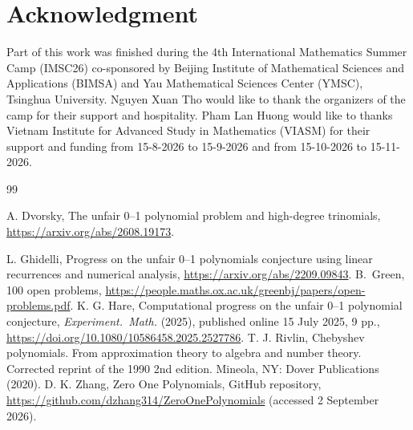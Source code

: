 \documentclass[a4paper,12pt,english,reqno]{amsart}
\theoremstyle{definition}
\theoremstyle{remark}
\begin{document}
\section{Acknowledgment} Part of this work was finished during the 4th International Mathematics Summer Camp (IMSC26) co-sponsored by Beijing Institute
of Mathematical Sciences and Applications (BIMSA) and Yau Mathematical Sciences Center
(YMSC), Tsinghua University. Nguyen Xuan Tho would like to thank the organizers of the camp for their support and hospitality. Pham Lan Huong would like to thanks Vietnam Institute for Advanced Study in Mathematics (VIASM) for their support and funding from 15-8-2026 to 15-9-2026 and from 15-10-2026 to 15-11-2026. 

\begin{thebibliography}{99}

A. Dvorsky,
The unfair 0--1 polynomial problem and high-degree trinomials, \url{https://arxiv.org/abs/2608.19173}.

L. Ghidelli,
Progress on the unfair 0--1 polynomials conjecture using linear recurrences
and numerical analysis, \url{https://arxiv.org/abs/2209.09843}.
 B.~Green, 100 open problems, 
 \url{https://people.maths.ox.ac.uk/greenbj/papers/open-problems.pdf}.
K. G. Hare,
Computational progress on the unfair 0--1 polynomial conjecture,
{\it Experiment.\ Math.} (2025), published online 15 July 2025, 9 pp.,
\url{https://doi.org/10.1080/10586458.2025.2527786}.
 T. J. Rivlin,
Chebyshev polynomials. From approximation theory to algebra and number theory. Corrected reprint of the 1990 2nd edition.
Mineola, NY: Dover Publications (2020).
D. K. Zhang, Zero One Polynomials, GitHub repository,
\url{https://github.com/dzhang314/ZeroOnePolynomials} (accessed 2 September
2026).
\end{thebibliography}
\end{document}
